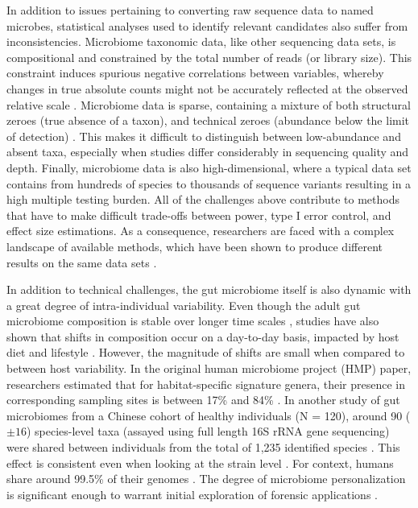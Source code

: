 In addition to issues pertaining to converting raw sequence data to named microbes, statistical analyses used to identify relevant candidates also suffer from inconsistencies. Microbiome taxonomic data, like other sequencing data sets, is compositional \cite{gloor2017microbiome, quinn2019field} and constrained by the total number of reads (or library size). This constraint induces spurious negative correlations between variables, whereby changes in true absolute counts might not be accurately reflected at the observed relative scale \cite{lin2020analysis, morton2019establishing}. Microbiome data is sparse, containing a mixture of both structural zeroes (true absence of a taxon), and technical zeroes (abundance below the limit of detection) \cite{kaul2017analysis, silverman2020naught}. This makes it difficult to distinguish between low-abundance and absent taxa, especially when studies differ considerably in sequencing quality and depth. Finally, microbiome data is also high-dimensional, where a typical data set contains from hundreds of species to thousands of sequence variants resulting in a high multiple testing burden. All of the challenges above contribute to methods that have to make difficult trade-offs between power, type I error control, and effect size estimations. As a consequence, researchers are faced with a complex landscape of available methods, which have been shown to produce different results on the same data sets \cite{nearing2022microbiome}.   

In addition to technical challenges, the gut microbiome itself is also dynamic with a great degree of intra-individual variability. Even though the adult gut microbiome composition is stable over longer time scales \cite{consortium2012structure}, studies have also shown that shifts in composition occur on a day-to-day basis, impacted by host diet and lifestyle \cite{david2014host, david2014diet}. However, the magnitude of shifts are small when compared to between host variability. In the original human microbiome project (HMP) paper, researchers estimated that for habitat-specific signature genera, their presence in corresponding sampling sites is between 17\% and 84\% \cite{consortium2012structure}. In another study of gut microbiomes from a Chinese cohort of healthy individuals (N = 120), around 90 ($\pm 16$) species-level taxa (assayed using full length 16S rRNA gene sequencing) were shared between individuals from the total of 1,235 identified species \cite{yang2020specieslevel}. This effect is consistent even when looking at the strain level \cite{lloyd-price2017strains}. For context, humans share around 99.5\% of their genomes \cite{genetics}. The degree of microbiome personalization is significant enough to warrant initial exploration of forensic applications \cite{fierer2010forensic}. 


